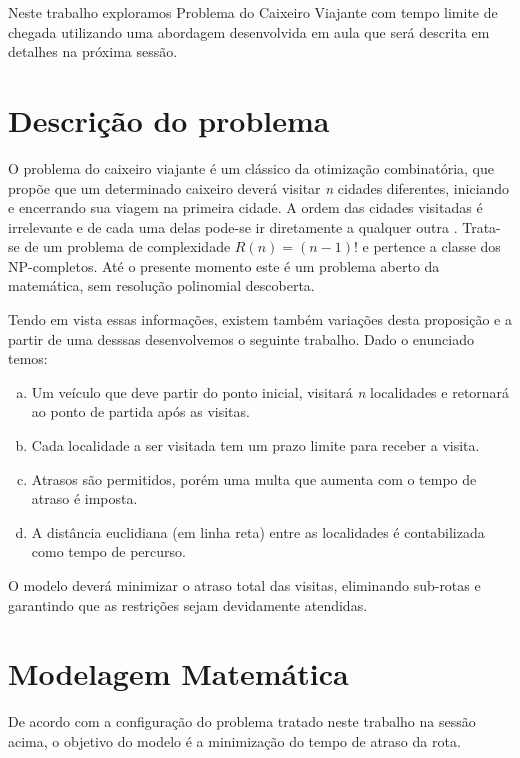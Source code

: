 \documentclass[12pt]{article}
\begin{document}
    Neste trabalho exploramos Problema do Caixeiro Viajante com tempo limite de chegada utilizando uma abordagem desenvolvida em aula que será descrita em detalhes na próxima sessão.



\section{Descrição do problema}

O problema do caixeiro viajante é um clássico da otimização combinatória, que propõe que um determinado caixeiro deverá visitar {\it n} cidades diferentes, iniciando e encerrando sua viagem na primeira cidade. A ordem das cidades visitadas é irrelevante e de cada uma delas pode-se ir diretamente a qualquer outra \cite{porto-da-silveira_2000}. Trata-se de um problema de complexidade $R(n) = (n -1)!$ e pertence a classe dos NP-completos. Até o presente momento este é um problema aberto da matemática, sem resolução polinomial descoberta.

Tendo em vista essas informações, existem também variações desta proposição e a partir de uma desssas desenvolvemos o seguinte trabalho. Dado o enunciado temos:


\begin{enumerate}[(a)]
  \item Um veículo que deve partir do ponto inicial, visitará {\it n} localidades e retornará ao ponto de partida após as visitas.
  \item Cada localidade a ser visitada tem um prazo limite para receber a visita.
  \item Atrasos são permitidos, porém uma multa que aumenta com o tempo de atraso é imposta.
  \item A distância euclidiana (em linha reta) entre as localidades é contabilizada como tempo de percurso.
\end{enumerate}

O modelo deverá minimizar o atraso total das visitas, eliminando sub-rotas e garantindo que as restrições sejam devidamente atendidas.  

    
    


\section{Modelagem Matemática}

    De acordo com a configuração do problema tratado neste trabalho na sessão acima, o objetivo do modelo é a minimização do tempo de atraso da rota. 
    
\end{document}
